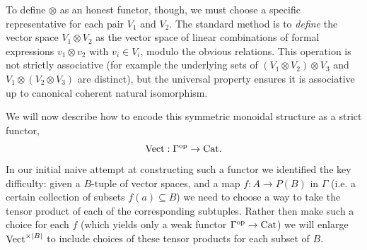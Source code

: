 \documentclass{amsart}
\begin{document}
To define $\otimes$ as an honest functor, though, we must choose a specific representative for each pair $V_1$ and $V_2$. The standard method is to {\em define} the vector space $V_1 \otimes V_2$ as the vector space of linear combinations of formal expressions $v_1 \otimes v_2$ with $v_i \in V_i$, modulo the obvious relations. This operation is not strictly associative (for example the underlying sets of $(V_1 \otimes V_2) \otimes V_3$ and $V_1 \otimes (V_2 \otimes V_3)$ are distinct), but the universal property ensures it is associative up to canonical coherent natural isomorphism.

We will now describe how to encode this symmetric monoidal structure as a strict functor,
\begin{equation*}
	\mathrm{Vect}: \Gamma^\text{op} \to \mathrm{Cat}.
\end{equation*}  
In our initial naive attempt at constructing such a functor we identified the key difficulty: given a $B$-tuple of vector spaces, and a map $f: A \to P(B)$ in $\Gamma$ (i.e. a certain collection of subsets $f(a) \subseteq B$) we need to choose a way to take the tensor product of each of the corresponding subtuples. Rather then make such a choice for each $f$ (which yields only a weak functor $\Gamma^\text{op} \to \mathrm{Cat}$) we will enlarge $\mathrm{Vect}^{\times |B|}$ to include choices of these tensor products for each subset of $B$. 
\end{document}
